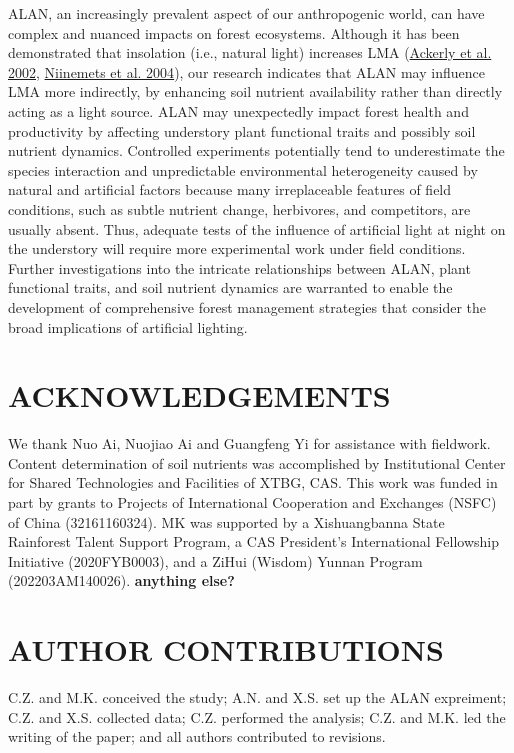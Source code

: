 \documentclass[
  12pt,
  letterpaper,
  DIV=11,
  numbers=noendperiod]{scrartcl}
\begin{document}
ALAN, an increasingly prevalent aspect of our anthropogenic world, can
have complex and nuanced impacts on forest ecosystems. Although it has
been demonstrated that insolation (i.e., natural light) increases LMA
(\protect\hyperlink{ref-Ackerly2002}{Ackerly et al. 2002},
\protect\hyperlink{ref-Niinemets2004}{Niinemets et al. 2004}), our
research indicates that ALAN may influence LMA more indirectly, by
enhancing soil nutrient availability rather than directly acting as a
light source. ALAN may unexpectedly impact forest health and
productivity by affecting understory plant functional traits and
possibly soil nutrient dynamics. Controlled experiments potentially tend
to underestimate the species interaction and unpredictable environmental
heterogeneity caused by natural and artificial factors because many
irreplaceable features of field conditions, such as subtle nutrient
change, herbivores, and competitors, are usually absent. Thus, adequate
tests of the influence of artificial light at night on the understory
will require more experimental work under field conditions. Further
investigations into the intricate relationships between ALAN, plant
functional traits, and soil nutrient dynamics are warranted to enable
the development of comprehensive forest management strategies that
consider the broad implications of artificial lighting.

\hypertarget{acknowledgements}{%
\section{ACKNOWLEDGEMENTS}\label{acknowledgements}}

We thank Nuo Ai, Nuojiao Ai and Guangfeng Yi for assistance with
fieldwork. Content determination of soil nutrients was accomplished by
Institutional Center for Shared Technologies and Facilities of XTBG,
CAS. This work was funded in part by grants to Projects of International
Cooperation and Exchanges (NSFC) of China (32161160324). MK was
supported by a Xishuangbanna State Rainforest Talent Support Program, a
CAS President's International Fellowship Initiative (2020FYB0003), and a
ZiHui (Wisdom) Yunnan Program (202203AM140026). \textbf{anything else?}

\hypertarget{author-contributions}{%
\section{AUTHOR CONTRIBUTIONS}\label{author-contributions}}

C.Z. and M.K. conceived the study; A.N. and X.S. set up the ALAN
expreiment; C.Z. and X.S. collected data; C.Z. performed the analysis;
C.Z. and M.K. led the writing of the paper; and all authors contributed
to revisions.
\end{document}
